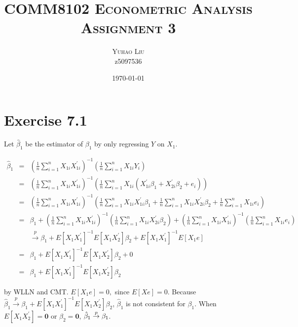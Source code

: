 \documentclass{article}
\begin{document}
\title{ \textsc{COMM8102 Econometric Analysis} \\
\textsc{Assignment 3}}
\author{\textsc{Yuhao Liu} \\
{\small z5097536}}
\date{{\small \today}}
\maketitle

\section*{Exercise 7.1}

Let $\hat{\beta}_{1}$ be the estimator of $\beta _{1}$ by only regressing $Y$
on $X_{1}$.

\begin{eqnarray*}
\hat{\beta}_{1} &=&\left( \frac{1}{n}\sum_{i=1}^{n}X_{1i}X_{1i}^{\prime
}\right) ^{-1}\left( \frac{1}{n}\sum_{i=1}^{n}X_{1i}Y_{i}\right)  \\
&=&\left( \frac{1}{n}\sum_{i=1}^{n}X_{1i}X_{1i}^{\prime }\right) ^{-1}\left( 
\frac{1}{n}\sum_{i=1}^{n}X_{1i}\left( X_{1i}^{\prime }\beta
_{1}+X_{2i}^{\prime }\beta _{2}+e_{i}\right) \right)  \\
&=&\left( \frac{1}{n}\sum_{i=1}^{n}X_{1i}X_{1i}^{\prime }\right) ^{-1}\left( 
\frac{1}{n}\sum_{i=1}^{n}X_{1i}X_{1i}^{\prime }\beta _{1}+\frac{1}{n}%
\sum_{i=1}^{n}X_{1i}X_{2i}^{\prime }\beta _{2}+\frac{1}{n}%
\sum_{i=1}^{n}X_{1i}e_{i}\right)  \\
&=&\beta _{1}+\left( \frac{1}{n}\sum_{i=1}^{n}X_{1i}X_{1i}^{\prime }\right)
^{-1}\left( \frac{1}{n}\sum_{i=1}^{n}X_{1i}X_{2i}^{\prime }\beta _{2}\right)
+\left( \frac{1}{n}\sum_{i=1}^{n}X_{1i}X_{1i}^{\prime }\right) ^{-1}\left( 
\frac{1}{n}\sum_{i=1}^{n}X_{1i}e_{i}\right)  \\
&&\overset{p}{\rightarrow }\beta _{1}+E\left[ X_{1}X_{1}^{\prime }\right]
^{-1}E\left[ X_{1}X_{2}^{\prime }\right] \beta _{2}+E\left[
X_{1}X_{1}^{\prime }\right] ^{-1}E\left[ X_{1}e\right]  \\
&=&\beta _{1}+E\left[ X_{1}X_{1}^{\prime }\right] ^{-1}E\left[
X_{1}X_{2}^{\prime }\right] \beta _{2}+0 \\
&=&\beta _{1}+E\left[ X_{1}X_{1}^{\prime }\right] ^{-1}E\left[
X_{1}X_{2}^{\prime }\right] \beta _{2}
\end{eqnarray*}

by WLLN and CMT. $E\left[ X_{1}e\right] =0,$ since $E\left[ Xe\right] =0$.
Because $\hat{\beta}_{1}\overset{p}{\rightarrow }\beta _{1}+E\left[
X_{1}X_{1}^{\prime }\right] ^{-1}E\left[ X_{1}X_{2}^{\prime }\right] \beta
_{2}$, $\hat{\beta}_{1}$ is not consistent for $\beta _{1}.$ When $E\left[
X_{1}X_{2}^{\prime }\right] =\mathbf{0}$ or $\beta _{2}=\mathbf{0}$, $\hat{%
\beta}_{1}\overset{p}{\rightarrow }\beta _{1}$.
\end{document}
